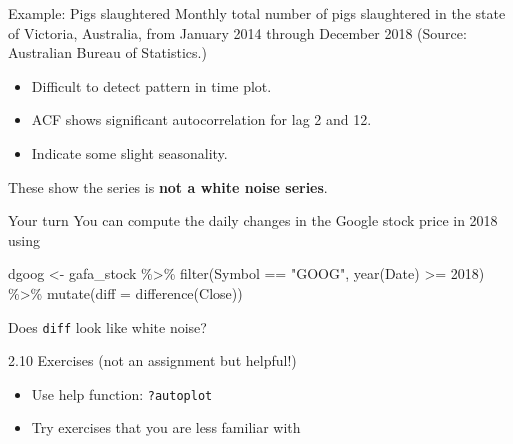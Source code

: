 \documentclass[14pt,ignorenonframetext,aspectratio=169]{beamer}
\newenvironment{Shaded}{\begin{snugshade}}{\end{snugshade}}
\newcommand{\AttributeTok}[1]{\textcolor[rgb]{0.77,0.63,0.00}{#1}}
\newcommand{\DecValTok}[1]{\textcolor[rgb]{0.00,0.00,0.81}{#1}}
\newcommand{\FunctionTok}[1]{\textcolor[rgb]{0.00,0.00,0.00}{#1}}
\newcommand{\NormalTok}[1]{#1}
\newcommand{\OtherTok}[1]{\textcolor[rgb]{0.56,0.35,0.01}{#1}}
\newcommand{\SpecialCharTok}[1]{\textcolor[rgb]{0.00,0.00,0.00}{#1}}
\newcommand{\StringTok}[1]{\textcolor[rgb]{0.31,0.60,0.02}{#1}}
\providecommand{\tightlist}{%
  \setlength{\itemsep}{0pt}\setlength{\parskip}{0pt}}
\renewenvironment{Shaded}{\color{black}\begin{snugshade}\color{black}}{\end{snugshade}}
\renewenvironment{Shaded}{\color{black}\fontsize{10}{10}\sf\begin{snugshade}\color{black}}{\end{snugshade}}
\begin{document}
\begin{frame}{Example: Pigs slaughtered}
\protect\hypertarget{example-pigs-slaughtered-2}{}
Monthly total number of pigs slaughtered in the state of Victoria,
Australia, from January 2014 through December 2018 (Source: Australian
Bureau of Statistics.)\pause

\begin{itemize}
\tightlist
\item
  Difficult to detect pattern in time plot.
\item
  ACF shows significant autocorrelation for lag 2 and 12.
\item
  Indicate some slight seasonality.
\end{itemize}

\pause

These show the series is \textbf{not a white noise series}.
\end{frame}

\begin{frame}[fragile]{Your turn}
\protect\hypertarget{your-turn}{}
You can compute the daily changes in the Google stock price in 2018
using

\fontsize{11.5}{15}\sf

\begin{Shaded}
\begin{Highlighting}[]
\NormalTok{dgoog }\OtherTok{\textless{}{-}}\NormalTok{ gafa\_stock }\SpecialCharTok{\%\textgreater{}\%}
  \FunctionTok{filter}\NormalTok{(Symbol }\SpecialCharTok{==} \StringTok{"GOOG"}\NormalTok{, }\FunctionTok{year}\NormalTok{(Date) }\SpecialCharTok{\textgreater{}=} \DecValTok{2018}\NormalTok{) }\SpecialCharTok{\%\textgreater{}\%}
  \FunctionTok{mutate}\NormalTok{(}\AttributeTok{diff =} \FunctionTok{difference}\NormalTok{(Close))}
\end{Highlighting}
\end{Shaded}

\fontsize{14}{16}\sf

Does \texttt{diff} look like white noise?
\end{frame}

\begin{frame}[fragile]{2.10 Exercises (not an assignment but helpful!)}
\protect\hypertarget{exercises-not-an-assignment-but-helpful}{}
\begin{itemize}
\item
  Use help function: \texttt{?autoplot}
\item
  Try exercises that you are less familiar with
\end{itemize}
\end{frame}
\end{document}
